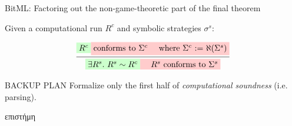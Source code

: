 \documentclass[aspectratio=169]{beamer}
\renewcommand\alert[1]{\textcolor{mLightBrown}{#1}}
\begin{document}
\begin{frame}{BitML: Factoring out the non-game-theoretic part of the final theorem}

Given a computational run $R^c$ and symbolic strategies $\sigma^s$:

\[
\infer
  {\colorbox{green!20}{$\exists R^s. \ R^s \sim R^c$}
   \colorbox{red!20}{$\quad R^s$ conforms to $\Sigma^s$}}
  {\colorbox{green!20}{$R^c$} \colorbox{red!20}{conforms to $\Sigma^c \quad$
  where $\Sigma^c$ := $\aleph(\Sigma^s)$}}
\]

\begin{alertblock}{BACKUP PLAN}
Formalize only the first half of \textit{computational soundness} (i.e. \alert{parsing}).
\end{alertblock}
\end{frame}

\begin{frame}[standout]
\Large{επιστήμη}
\end{frame}
\end{document}

